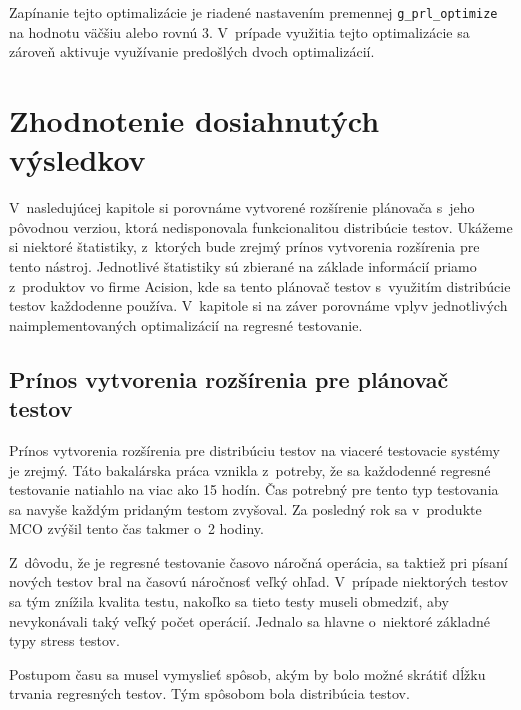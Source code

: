 Zapínanie tejto optimalizácie je riadené nastavením premennej 
\texttt{g\_prl\_optimize} na hodnotu väčšiu alebo rovnú 3. 
V~prípade využitia tejto optimalizácie sa zároveň aktivuje využívanie 
predošlých dvoch optimalizácií.



%
%
\chapter{Zhodnotenie dosiahnutých výsledkov}
\label{kapitola:zhodnotenie_vysledkov}
V~nasledujúcej kapitole si porovnáme vytvorené rozšírenie plánovača s~jeho
pôvodnou verziou, ktorá nedisponovala funkcionalitou distribúcie testov.
Ukážeme si niektoré štatistiky, z~ktorých bude zrejmý prínos vytvorenia
rozšírenia pre tento nástroj. Jednotlivé štatistiky sú zbierané na základe
informácií priamo z~produktov vo firme Acision, kde sa tento plánovač testov
s~využitím distribúcie testov každodenne používa. V~kapitole si na záver 
porovnáme vplyv jednotlivých naimplementovaných optimalizácií na regresné
testovanie. 


\section{Prínos vytvorenia rozšírenia pre plánovač testov}
\label{sekcia:prinos_pouzitia}
Prínos vytvorenia rozšírenia pre distribúciu testov na viaceré testovacie 
systémy je zrejmý. Táto bakalárska práca vznikla z~potreby, že sa každodenné
regresné testovanie natiahlo na viac ako 15 hodín. Čas potrebný pre tento
typ testovania sa navyše každým pridaným testom zvyšoval. 
Za posledný rok sa v~produkte MCO zvýšil tento čas takmer o~2 hodiny.

Z~dôvodu, že je regresné testovanie časovo náročná operácia, sa taktiež 
pri písaní nových testov bral na časovú náročnosť veľký ohľad.
V~prípade niektorých testov sa tým znížila kvalita testu, nakoľko sa tieto
testy museli obmedziť, aby nevykonávali taký veľký počet operácií.
Jednalo sa hlavne o~niektoré základné typy stress testov.

Postupom času sa musel vymyslieť spôsob, akým by bolo možné skrátiť 
dĺžku trvania regresných testov. Tým spôsobom bola distribúcia testov.

